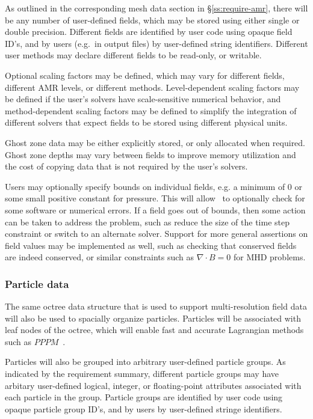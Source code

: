 \documentclass[10pt,twocolumn]{article}
\begin{document}
As outlined in the corresponding mesh data section in
\S\ref{ss:require-amr}, there will be any number of user-defined
fields, which may be stored using either single or double precision.
Different fields are identified by user code using opaque field ID's,
and by users (e.g.~in output files) by user-defined string
identifiers.  Different user methods may declare different fields to
be read-only, or writable.

Optional scaling factors may be defined, which may vary for different
fields, different AMR levels, or different methods.  Level-dependent
scaling factors may be defined if the user's solvers have
scale-sensitive numerical behavior, and method-dependent scaling
factors may be defined to simplify the integration of different
solvers that expect fields to be stored using different physical
units.

Ghost zone data may be either explicitly stored, or only allocated
when required.  Ghost zone depths may vary between fields to improve
memory utilization and the cost of copying data that is not required
by the user's solvers.  

Users may optionally specify bounds on individual fields, e.g. a
minimum of $0$ or some small positive constant for pressure.  This
will allow \cello\ to optionally check for some software or numerical
errors.  If a field goes out of bounds, then some action can be taken
to address the problem, such as reduce the size of the time step
constraint or switch to an alternate solver.  Support for more general
assertions on field values may be implemented as well, such as checking
that conserved fields are indeed conserved, or similar constraints
such as $\nabla\cdot B=0$ for MHD problems.

\subsubsection{Particle data} \label{sss:design-particles}

The same octree data structure that is used to support
multi-resolution field data will also be used to spacially organize
particles.  Particles will be associated with leaf nodes of the
octree, which will enable fast and accurate Lagrangian methods such
as $PPPM$~\cite{HoEa88}.

Particles will also be grouped into arbitrary user-defined particle
groups.  As indicated by the requirement summary, different particle
groups may have arbitary user-defined logical, integer, or
floating-point attributes associated with each particle in the group.
Particle groups are identified by user code using opaque particle
group ID's, and by users by user-defined stringe identifiers.
\end{document}
